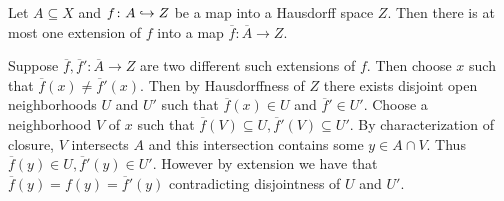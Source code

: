 \documentclass[letterpaper, 11pt, oneside]{book}
\begin{document}
\clearpage

\begin{lem}
  Let $A \subseteq X$ and $f\colon A \into Z$ be a map into a Hausdorff space $Z$.
  Then there is at most one extension of $f$ into a map $\overline{f}\colon \overline{A} \to Z$.
\end{lem}
\begin{pf}
  Suppose $\overline{f}, \overline{f}'\colon \overline{A} \to Z$ are two different such extensions of $f$.
  Then choose $x$ such that $\overline{f}(x) \neq \overline{f}'(x)$.
  Then by Hausdorffness of $Z$ there exists disjoint open neighborhoods $U$ and $U'$ such that $\overline{f}(x) \in U$ and $\overline{f}' \in U'$.
  Choose a neighborhood $V$ of $x$ such that $\overline{f}(V) \subseteq U, \overline{f}'(V) \subseteq U'$.
  By characterization of closure, $V$ intersects $A$ and this intersection contains some $y \in A \cap V$.
  Thus $\overline{f}(y) \in U, \overline{f}'(y) \in U'$.
  However by extension we have that $\overline{f}(y) = f(y) = \overline{f}'(y)$ contradicting disjointness of $U$ and $U'$.
\end{pf}
\end{document}
